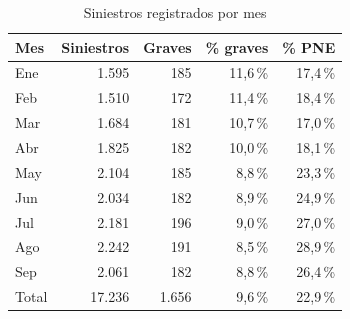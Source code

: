 \begin{table}[htbp]
\centering
\small
\caption{Siniestros registrados por mes}
\label{tab:a2}
\begin{tabular}{lrrrr}
\toprule
Mes & Siniestros & Graves & \% graves & \% PNE \\
\midrule
Ene & 1.595 & 185 & 11,6\,\% & 17,4\,\% \\
Feb & 1.510 & 172 & 11,4\,\% & 18,4\,\% \\
Mar & 1.684 & 181 & 10,7\,\% & 17,0\,\% \\
Abr & 1.825 & 182 & 10,0\,\% & 18,1\,\% \\
May & 2.104 & 185 & 8,8\,\% & 23,3\,\% \\
Jun & 2.034 & 182 & 8,9\,\% & 24,9\,\% \\
Jul & 2.181 & 196 & 9,0\,\% & 27,0\,\% \\
Ago & 2.242 & 191 & 8,5\,\% & 28,9\,\% \\
Sep & 2.061 & 182 & 8,8\,\% & 26,4\,\% \\
\midrule
Total & 17.236 & 1.656 & 9,6\,\% & 22,9\,\% \\
\bottomrule
\end{tabular}
\par\vspace{2pt}{\footnotesize PNE: Policía Nacional. La última columna muestra qué porcentaje de los registros del mes proviene de ese ente. Cálculo propio (Anexo B).}
\end{table}

